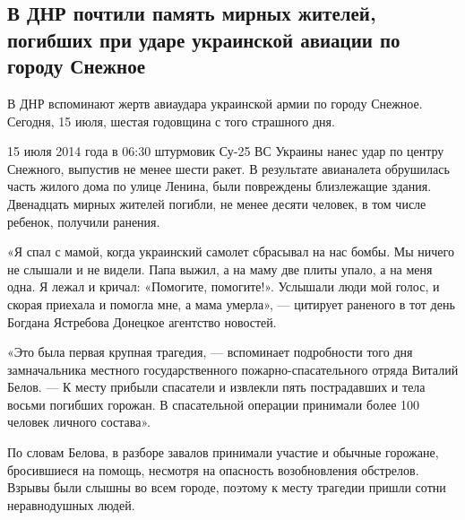  
 

\def\sectitle{В ДНР почтили память мирных жителей, погибших при ударе
украинской авиации по городу Снежное}

\subsection{\sectitle}
\label{sec:16_07_2020.news.dnr.tri_color_center.1}

  

В ДНР вспоминают жертв авиаудара украинской армии по городу Снежное. Сегодня,
15 июля, шестая годовщина с того страшного дня.

15 июля 2014 года в 06:30 штурмовик Су-25 ВС Украины нанес удар по центру
Снежного, выпустив не менее шести ракет. В результате авианалета обрушилась
часть жилого дома по улице Ленина, были повреждены близлежащие здания.
Двенадцать мирных жителей погибли, не менее десяти человек, в том числе
ребенок, получили ранения.

«Я спал с мамой, когда украинский самолет сбрасывал на нас бомбы. Мы ничего не
слышали и не видели. Папа выжил, а на маму две плиты упало, а на меня одна. Я
лежал и кричал: «Помогите, помогите!». Услышали люди мой голос, и скорая
приехала и помогла мне, а мама умерла», --- цитирует раненого в тот день Богдана
Ястребова Донецкое агентство новостей.

«Это была первая крупная трагедия, --- вспоминает подробности того дня
замначальника местного государственного пожарно-спасательного отряда Виталий
Белов. --- К месту прибыли спасатели и извлекли пять пострадавших и тела восьми
погибших горожан. В спасательной операции принимали более 100 человек личного
состава».

По словам Белова, в разборе завалов принимали участие и обычные горожане,
бросившиеся на помощь, несмотря на опасность возобновления обстрелов. Взрывы
были слышны во всем городе, поэтому к месту трагедии пришли сотни неравнодушных
людей.


